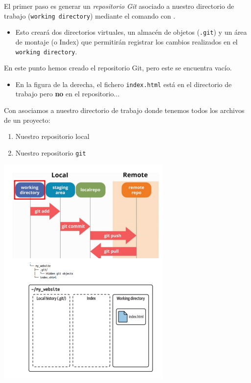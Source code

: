 \begin{minipage}{0.5\textwidth}
	El primer paso es generar un \textit{repositorio Git} asociado a
	nuestro directorio de trabajo (\texttt{working directory})
	mediante el comando con .
	\begin{itemize}
		\item Esto creará dos directorios virtuales, un almacén de objetos (\texttt{.git}) y un área de montaje (o Index) que permitirán registrar los cambios realizados en el \texttt{working directory}.
	\end{itemize}
	En este punto hemos creado el repositorio Git, pero este se encuentra vacío.
	\begin{itemize}
		\item  En la figura de la derecha, el fichero \texttt{index.html} está en el directorio de trabajo pero \textbf{no} en el repositorio...
	\end{itemize}
	Con  asociamos a nuestro directorio de trabajo donde tenemos todos los archivos de un proyecto:
	\begin{enumerate}[label=\arabic*)]
		\item Nuestro repositorio local
		\item Nuestro repositorio \texttt{git}
	\end{enumerate}
\end{minipage}\qquad\begin{minipage}{0.45\textwidth}
\begin{center}
	\includegraphics{"Temas/Tema 1/screenshot005"}
\end{center}
\end{minipage}

